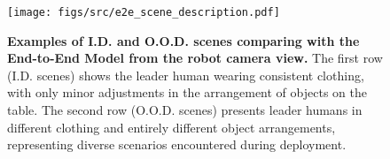 
\begin{figure}[t]
    \centering
    \texttt{[image: figs/src/e2e\_scene\_description.pdf]}
    \caption{
    \textbf{Examples of I.D. and O.O.D. scenes comparing \our with the End-to-End Model from the robot camera view.}
    The first row (I.D. scenes) shows the leader human wearing consistent clothing, with only minor adjustments in the arrangement of objects on the table.
    The second row (O.O.D. scenes) presents leader humans in different clothing and entirely different object arrangements, representing diverse scenarios encountered during deployment.
    }
    \label{fig:e2e_scene}
\end{figure}
